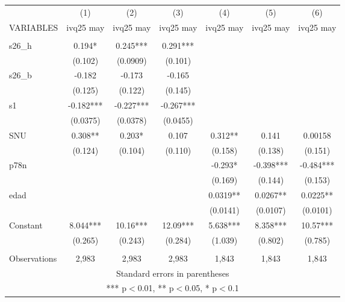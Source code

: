 \begin{tabular}{lcccccc} \hline
 & (1) & (2) & (3) & (4) & (5) & (6) \\
VARIABLES & ivq25 may & ivq25 may & ivq25 may & ivq25 may & ivq25 may & ivq25 may \\ \hline
 &  &  &  &  &  &  \\
s26\_h & 0.194* & 0.245*** & 0.291*** &  &  &  \\
 & (0.102) & (0.0909) & (0.101) &  &  &  \\
s26\_b & -0.182 & -0.173 & -0.165 &  &  &  \\
 & (0.125) & (0.122) & (0.145) &  &  &  \\
s1 & -0.182*** & -0.227*** & -0.267*** &  &  &  \\
 & (0.0375) & (0.0378) & (0.0455) &  &  &  \\
SNU & 0.308** & 0.203* & 0.107 & 0.312** & 0.141 & 0.00158 \\
 & (0.124) & (0.104) & (0.110) & (0.158) & (0.138) & (0.151) \\
p78n &  &  &  & -0.293* & -0.398*** & -0.484*** \\
 &  &  &  & (0.169) & (0.144) & (0.153) \\
edad &  &  &  & 0.0319** & 0.0267** & 0.0225** \\
 &  &  &  & (0.0141) & (0.0107) & (0.0101) \\
Constant & 8.044*** & 10.16*** & 12.09*** & 5.638*** & 8.358*** & 10.57*** \\
 & (0.265) & (0.243) & (0.284) & (1.039) & (0.802) & (0.785) \\
 &  &  &  &  &  &  \\
 Observations & 2,983 & 2,983 & 2,983 & 1,843 & 1,843 & 1,843 \\ \hline
\multicolumn{7}{c}{ Standard errors in parentheses} \\
\multicolumn{7}{c}{ *** p$<$0.01, ** p$<$0.05, * p$<$0.1} \\
\end{tabular}
